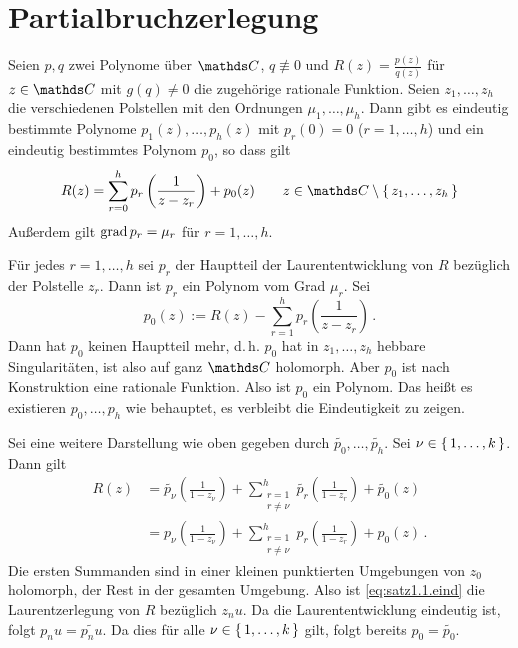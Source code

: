 \section{Partialbruchzerlegung}


\begin{satz}
Seien $p, q$ zwei Polynome über $\CC$, $q \not\equiv 0$ und $R(z) = \frac{p(z)}{q(z)}$ für $z\in\CC$ mit $g(q)\not=0$ die zugehörige rationale Funktion.
Seien $z_1, \ldots, z_h$ die verschiedenen Polstellen mit den Ordnungen $\mu_1,\ldots, \mu_h$.
Dann gibt es eindeutig bestimmte Polynome $p_1(z), \ldots, p_h(z)$ mit $p_r(0) = 0$ ($r=1,\ldots,h$) und ein eindeutig bestimmtes Polynom $p_0$, so dass gilt
\[
	R(z) = \sum_{r=0}^h p_r\left(\frac{1}{z-z_r}\right) + p_0(z) \qquad z \in \CC\setminus\Set{z_1, \ldots, z_h}
\]
Außerdem gilt $\operatorname{grad} p_r = \mu_r$ für $r=1,\ldots,h$.
\end{satz}

\begin{bewe}
Für jedes $r=1,\ldots,h$ sei $p_r$ der Hauptteil der Laurententwicklung von $R$ bezüglich der Polstelle $z_r$.
Dann ist $p_r$ ein Polynom vom Grad $\mu_r$.
Sei
\[
	p_0(z) := R(z) - \sum_{r=1}^h p_r\left(\frac{1}{z-z_r}\right)\,.
\]
Dann hat $p_0$ keinen Hauptteil mehr, d.\,h. $p_0$ hat in $z_1,\ldots,z_h$ hebbare Singularitäten, ist also auf ganz $\CC$ holomorph.
Aber $p_0$ ist nach Konstruktion eine rationale Funktion.
Also ist $p_0$ ein Polynom.
Das heißt es existieren $p_0, \ldots, p_h$ wie behauptet, es verbleibt die Eindeutigkeit zu zeigen.

Sei eine weitere Darstellung wie oben gegeben durch $\tilde{p_0}, \ldots, \tilde{p_h}$.
Sei $\nu \in \left\{\,1,\ldots,k\,\right\}$.
Dann gilt
\begin{align}\label{eq:satz1.1.eind}
	R(z)
	&= \tilde{p_\nu}\left(\frac{1}{1-z_\nu}\right) + \sum_{\substack{r=1\\\scriptscriptstyle r\not=\nu}}^h \tilde{p_r}\left(\frac{1}{1-z_r}\right) + \tilde{p_0}(z) \\
	&= p_\nu\left(\frac{1}{1-z_\nu}\right) + \sum_{\substack{r=1\\\scriptscriptstyle r\not=\nu}}^h p_r\left(\frac{1}{1-z_r}\right) + p_0(z)
	\,. \nonumber
\end{align}
Die ersten Summanden sind in einer kleinen punktierten Umgebungen von $z_0$ holomorph, der Rest in der gesamten Umgebung.
Also ist \eqref{eq:satz1.1.eind} die Laurentzerlegung von $R$ bezüglich $z_nu$.
Da die Laurententwicklung eindeutig ist, folgt $p_nu = \tilde{p_nu}$.
Da dies für alle $\nu \in \left\{\,1,\ldots,k\,\right\}$ gilt, folgt bereits $p_0 = \tilde{p_0}$.
\end{bewe}

